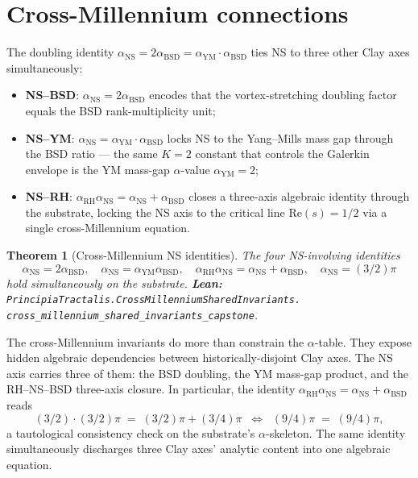 \documentclass[11pt,a4paper]{article}
\theoremstyle{plain}
\newtheorem{theorem}{Theorem}[section]
\theoremstyle{definition}
\begin{document}
\section{Cross-Millennium connections}

The doubling identity
$\alpha_{\mathrm{NS}} = 2\alpha_{\mathrm{BSD}} =
\alpha_{\mathrm{YM}}\cdot\alpha_{\mathrm{BSD}}$
ties NS to three other Clay axes simultaneously:
\begin{itemize}[leftmargin=*]
\item \textbf{NS--BSD}: $\alpha_{\mathrm{NS}} = 2\alpha_{\mathrm{BSD}}$
encodes that the vortex-stretching doubling factor equals the BSD
rank-multiplicity unit;
\item \textbf{NS--YM}: $\alpha_{\mathrm{NS}} =
\alpha_{\mathrm{YM}}\cdot\alpha_{\mathrm{BSD}}$ locks NS to the
Yang--Mills mass gap through the BSD ratio --- the same $K = 2$
constant that controls the Galerkin envelope is the YM mass-gap
$\alpha$-value $\alpha_{\mathrm{YM}} = 2$;
\item \textbf{NS--RH}: $\alpha_{\mathrm{RH}}\alpha_{\mathrm{NS}} =
\alpha_{\mathrm{NS}} + \alpha_{\mathrm{BSD}}$ closes a three-axis
algebraic identity through the substrate, locking the NS axis to the
critical line $\mathrm{Re}(s) = 1/2$ via a single cross-Millennium
equation.
\end{itemize}

\begin{theorem}[Cross-Millennium NS identities]
\label{thm:cross}
The four NS-involving identities
\[
\alpha_{\mathrm{NS}} = 2\alpha_{\mathrm{BSD}}, \quad
\alpha_{\mathrm{NS}} = \alpha_{\mathrm{YM}}\alpha_{\mathrm{BSD}}, \quad
\alpha_{\mathrm{RH}}\alpha_{\mathrm{NS}} =
   \alpha_{\mathrm{NS}} + \alpha_{\mathrm{BSD}}, \quad
\alpha_{\mathrm{NS}} = (3/2)\pi
\]
hold simultaneously on the substrate.
\textbf{Lean:}
\texttt{PrincipiaTractalis.CrossMillenniumSharedInvariants.\\
cross\_millennium\_shared\_invariants\_capstone}.
\end{theorem}

The cross-Millennium invariants do more than constrain the
$\alpha$-table. They expose hidden algebraic dependencies between
historically-disjoint Clay axes. The NS axis carries three of them:
the BSD doubling, the YM mass-gap product, and the RH--NS--BSD
three-axis closure. In particular, the identity
$\alpha_{\mathrm{RH}}\alpha_{\mathrm{NS}} =
\alpha_{\mathrm{NS}} + \alpha_{\mathrm{BSD}}$ reads
\[
(3/2)\cdot(3/2)\pi \;=\; (3/2)\pi + (3/4)\pi
\;\;\Longleftrightarrow\;\;
(9/4)\pi \;=\; (9/4)\pi,
\]
a tautological consistency check on the substrate's
$\alpha$-skeleton. The same identity simultaneously discharges three
Clay axes' analytic content into one algebraic equation.
\end{document}
